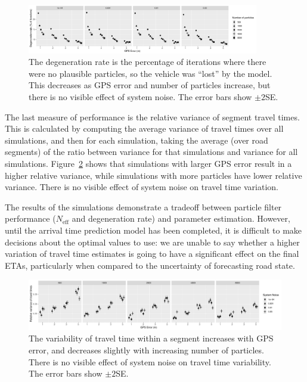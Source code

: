 \begin{figure}[tb]
    \centering
    \includegraphics[width=0.9\textwidth]{figures/04_model_results_degen.pdf}
    \caption{
        The degeneration rate is the percentage of iterations where there were no
        plausible particles, so the vehicle was ``lost'' by the model.
        This decreases as GPS error and number of particles increase,
        but there is no visible effect of system noise.
        The error bars show $\pm 2$SE.
    }
    \label{fig:degen_rate}
\end{figure}


The last measure of performance is the relative variance of segment travel times.
This is calculated by computing the average variance of travel times over all simulations,
and then for each simulation, 
taking the average (over road segments) of the ratio between variance for that simulations
and variance for all simulations.
Figure~\ref{fig:travel_times} shows that simulations with larger GPS error
result in a higher relative variance,
while simulations with more particles have lower relative variance.
There is no visible effect of system noise on travel time variation.


The results of the simulations
demonstrate a tradeoff between particle filter performance
($N_\text{eff}$ and degeneration rate) and parameter estimation.
However, until the arrival time prediction model has been completed,
it is difficult to make decisions about the optimal values to use:
we are unable to say whether a higher variation of travel time estimates
is going to have a significant effect on the final ETAs,
particularly when compared to the uncertainty of forecasting road state.


\begin{figure}[tb]
    \centering
    \includegraphics[width=\textwidth]{figures/04_model_results_times.pdf}
    \caption{
        The variability of travel time within a segment increases with GPS error,
        and decreases slightly with increasing number of particles.
        There is no visible effect of system noise on travel time variability.
        The error bars show $\pm 2$SE.
    }
    \label{fig:travel_times}
\end{figure}


